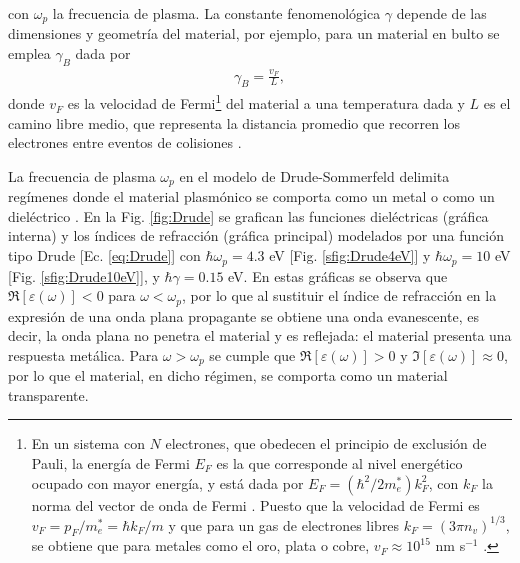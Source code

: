 %
	\begin{tcolorbox}[title = Modelo de Drude-Sommerfeld, breakable ]
	\end{tcolorbox}\vspace*{-.75em}\noindent
%
con $\omega_p$ la frecuencia de plasma. La constante fenomenológica $\gamma$ depende de las dimensiones y geometría del material, por ejemplo, para un material en bulto se emplea  $\gamma_B$ dada por \cite{kreibig1995clusters} 
%
	\begin{align}
	\gamma_B = \frac{v_F}{L},
			 \label{eq:gammaInf}	
	\end{align}
%
donde $v_F$ es la velocidad de Fermi\footnote{En un sistema con $N$ electrones, que obedecen el principio  de exclusión de Pauli, la energía de Fermi $E_F$ es la que corresponde al nivel energético ocupado con mayor energía, y está dada por $E_F = (\hbar^2/2m_e^*)k_F^2$, con $k_F$ la norma del vector de onda de Fermi \cite{gross2014festkorperphysik}.  Puesto que la velocidad de Fermi es $v_F = p_F/m_e^* = \hbar k_F / m$ y que para un gas de electrones libres $k_F=(3\pi n_v)^{1/3}$, se obtiene que para metales como el oro, plata o cobre,  $v_F\approx 10^{15}$ nm s$^{-1}$ \cite{gross2014festkorperphysik,ashcroft1976solid}. } del material a una temperatura dada y $L$ es el camino libre medio, que representa la distancia promedio que recorren los electrones entre eventos de colisiones \cite{gross2014festkorperphysik}.  

La frecuencia de plasma $\omega_p$ en el modelo de Drude-Sommerfeld delimita regímenes donde el material plasmónico se comporta como un metal o como un dieléctrico \cite{trugler2011properties}.  En la Fig.  \ref{fig:Drude} se grafican las funciones dieléctricas (gráfica interna) y los índices de refracción  (gráfica principal) modelados por una función tipo Drude [Ec. \eqref{eq:Drude}] con $\hbar\omega_p=4. 3$ eV [Fig.  \ref{sfig:Drude4eV}] y $\hbar\omega_p=10$ eV [Fig.  \ref{sfig:Drude10eV}], y $\hbar\gamma=0. 15$ eV.  En estas gráficas se observa que $\Re[\varepsilon(\omega)]<0$ para $\omega<\omega_p$, por lo que al sustituir el índice de refracción en la expresión de una onda plana propagante se obtiene una onda evanescente, es decir, la onda plana no penetra el material y es reflejada: el material presenta una respuesta metálica.  Para $\omega>\omega_p$ se cumple que $\Re[\varepsilon(\omega)]>0$ y $\Im[\varepsilon(\omega)]\approx 0$, por lo que el material, en dicho régimen, se comporta como un  material transparente. 

